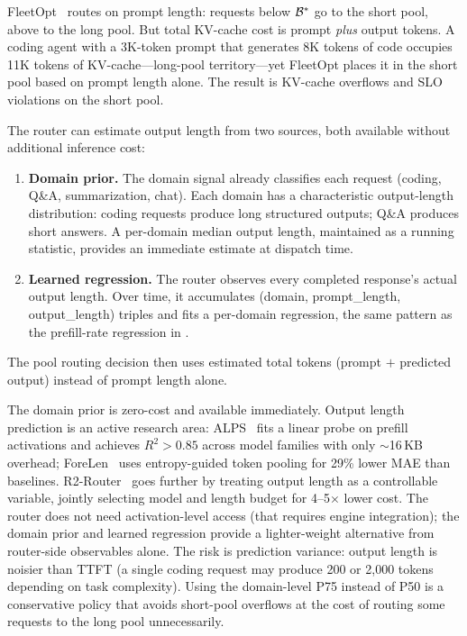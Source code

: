 \begin{opportunity}
\label{opp:output-length}
FleetOpt~\cite{fleetopt2026} routes on prompt length: requests
below $\mathcal{B}^*$ go to the short pool, above to the long pool.
But total KV-cache cost is prompt \emph{plus} output tokens.
A coding agent with a 3K-token prompt that generates 8K tokens of
code occupies 11K tokens of KV-cache---long-pool territory---yet
FleetOpt places it in the short pool based on prompt length alone.
The result is KV-cache overflows and SLO violations on the short
pool.

The router can estimate output length from two sources, both
available without additional inference cost:
\begin{enumerate}[nosep]
  \item \textbf{Domain prior.}  The domain signal already
        classifies each request (coding, Q\&A, summarization,
        chat).  Each domain has a characteristic output-length
        distribution: coding requests produce long structured
        outputs; Q\&A produces short answers.  A per-domain
        median output length, maintained as a running statistic,
        provides an immediate estimate at dispatch time.
  \item \textbf{Learned regression.}  The router observes every
        completed response's actual output length.  Over time, it
        accumulates (domain, prompt\_length, output\_length) triples
        and fits a per-domain regression, the same pattern as the
        prefill-rate regression in .
\end{enumerate}
The pool routing decision then uses estimated total tokens
(prompt $+$ predicted output) instead of prompt length alone.

\begin{frisk}
The domain prior is zero-cost and available immediately.  Output
length prediction is an active research area:
ALPS~\cite{alps2025} fits a linear probe on prefill activations
and achieves $R^2 > 0.85$ across model families with only
$\sim$16\,KB overhead; ForeLen~\cite{forelen2026} uses
entropy-guided token pooling for 29\% lower MAE than baselines.
R2-Router~\cite{r2router2026} goes further by treating output
length as a controllable variable, jointly selecting model and
length budget for 4--5$\times$ lower cost.  The router does not
need activation-level access (that requires engine integration);
the domain prior and learned regression provide a lighter-weight
alternative from router-side observables alone.  The risk is
prediction variance: output length is noisier than TTFT (a single
coding request may produce 200 or 2,000 tokens depending on task
complexity).  Using the domain-level P75 instead of P50 is a
conservative policy that avoids short-pool overflows at the cost
of routing some requests to the long pool unnecessarily.
\end{frisk}
\end{opportunity}

